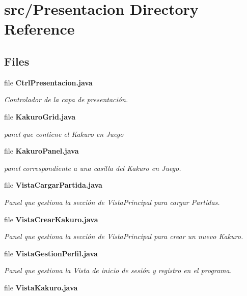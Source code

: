 \section{src/\+Presentacion Directory Reference}
\label{dir_4e52472c7c0acb2528a61d2722b4b6d0}
\subsection*{Files}
\begin{DoxyCompactItemize}
\item 
file \textbf{ Ctrl\+Presentacion.\+java}
\begin{DoxyCompactList}\small\item\em Controlador de la capa de presentación. \end{DoxyCompactList}\item 
file \textbf{ Kakuro\+Grid.\+java}
\begin{DoxyCompactList}\small\item\em panel que contiene el Kakuro en Juego \end{DoxyCompactList}\item 
file \textbf{ Kakuro\+Panel.\+java}
\begin{DoxyCompactList}\small\item\em panel correspondiente a una casilla del Kakuro en Juego. \end{DoxyCompactList}\item 
file \textbf{ Vista\+Cargar\+Partida.\+java}
\begin{DoxyCompactList}\small\item\em Panel que gestiona la sección de Vista\+Principal para cargar Partidas. \end{DoxyCompactList}\item 
file \textbf{ Vista\+Crear\+Kakuro.\+java}
\begin{DoxyCompactList}\small\item\em Panel que gestiona la sección de Vista\+Principal para crear un nuevo Kakuro. \end{DoxyCompactList}\item 
file \textbf{ Vista\+Gestion\+Perfil.\+java}
\begin{DoxyCompactList}\small\item\em Panel que gestiona la Vista de inicio de sesión y registro en el programa. \end{DoxyCompactList}\item 
file \textbf{ Vista\+Kakuro.\+java}

\end{DoxyCompactItemize}
